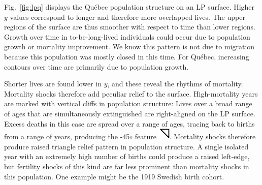\documentclass{bmcart}
\begin{document}
Fig.~\ref{fig:lpq} displays the Qu\'{e}bec population structure on an LP surface. Higher $y$ values correspond to longer and therefore more overlapped lives. The upper regions of the surface are thus smoother with respect to time than lower regions. Growth over time in to-be-long-lived individuals could occur due to population growth or mortality improvement. We know this pattern is not due to migration because this population was mostly closed in this time. For Qu\'{e}bec, increasing contours over time are primarily due to population growth. 

Shorter lives are found lower in $y$, and these reveal the rhythms of mortality. Mortality shocks therefore add peculiar relief to the surface. High-mortality years are marked with vertical cliffs in population structure: Lives over a broad range of ages that are simultaneously extinguished are right-aligned on the LP surface. Excess deaths in this case are spread over a range of ages, tracing back to births from a range of years, producing the -45$\circ$ feature \includegraphics{Figures/LP_mort_tri.pdf}. Mortality shocks therefore produce raised triangle relief pattern in population structure. A single isolated year with an extremely high number of births could produce a raised left-edge, but fertility shocks of this kind are far less prominent than mortality shocks in this population. One example might be the 1919 Swedish birth cohort.

\end{document}
